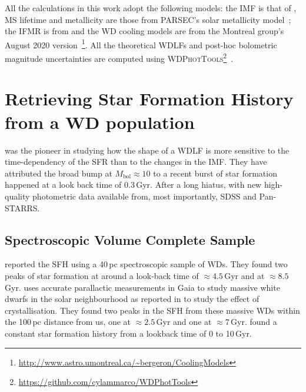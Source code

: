 \documentclass[fleqn,usenatbib]{mnras}
\begin{document}
All the calculations in this work adopt the following models: the IMF is that of
\citet{2003PASP..115..763C}, MS lifetime and metallicity are those from
PARSEC's solar metallicity model~\citep[Z=0.017, Y=0.279;][]{2012MNRAS.427..127B}; the IFMR is
from \citet{2008MNRAS.387.1693C} and the WD cooling models are from the
Montreal group's August 2020 version~\citep{2020ApJ...901...93B}\footnote{\url{http://www.astro.umontreal.ca/~bergeron/CoolingModels}}.
All the theoretical WDLFs and post-hoc bolometric magnitude uncertainties are
computed using \textsc{WDPhotTools}\footnote{\url{https://github.com/cylammarco/WDPhotTools}}~\citep{marco_c_lam_2022_6595029, 
2022RASTI...1...81L}.

\section{Retrieving Star Formation History from a WD population}
\citet{1990ApJ...352..605N} was the pioneer in studying how the shape of
a WDLF is more sensitive to the time-dependency of the SFR than to the changes
in the IMF. They have attributed the broad bump at $M_{\mathrm{bol}} \approx 10$
to a recent burst of star formation happened at a look back time of 0.3\,Gyr.
After a long hiatus, with new high-quality photometric data available from,
most importantly, SDSS and Pan-STARRS.

\subsection{Spectroscopic Volume Complete Sample}
\citet{2014ApJ...791...92T} reported the SFH using a 40\,pc spectroscopic sample
of WDs. They found two peaks of star formation at around a look-back time of
$\approx4.5$\,Gyr and at $\approx8.5$\,Gyr. \citet{2019ApJ...878L..11I}
uses accurate parallactic measurements in Gaia to study massive white dwarfs in
the solar neighbourhood as reported in \citet{2019Natur.565..202T} to study the
effect of crystallisation. They found two peaks in the SFH from these massive
WDs within the 100\,pc distance from us, one at $\approx2.5$\,Gyr and one at
$\approx7$\,Gyr. \citet[][hereafter, C23]{2023MNRAS.522.1643C} found a constant star formation
history from a lookback time of 0 to 10\,Gyr.

\end{document}
